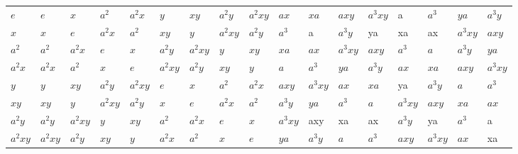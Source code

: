 {\begin{table}[h]
\begin{minipage}{\textwidth}
\begin{tabular}{l|llllllllllllllll}
$e$        &\cellcolor{blue!25} $e$        &\cellcolor{blue!25} $x$ &\cellcolor{blue!25} $a^{2}$ &\cellcolor{blue!25} $a^{2}x$ &\cellcolor{blue!25} $y$ &\cellcolor{blue!25} $xy$ &\cellcolor{blue!25} $a^{2}y$ &\cellcolor{blue!25} $a^{2}xy$ & $ax$ & $xa$ & $axy$ & $a^{3}xy$ & a & $a^{3}$ & $ya$ & $a^{3}y$ \\
$x$        &\cellcolor{blue!25} $x$        &\cellcolor{blue!25} $e$        &\cellcolor{blue!25} $a^{2}x$ &\cellcolor{blue!25} $a^{2}$ & \cellcolor{blue!25}$xy$ &\cellcolor{blue!25} $y$ &\cellcolor{blue!25} $a^{2}xy$ &\cellcolor{blue!25} $a^{2}y$ & $a^{3}$ & a & $a^{3}y$ & ya & xa & ax & $a^{3}xy$ & $axy$ \\
$a^{2}$  &\cellcolor{blue!25} $a^{2}$  &\cellcolor{blue!25} $a^{2}x$ &\cellcolor{blue!25} $e$ &\cellcolor{blue!25} $x$ &\cellcolor{blue!25} $a^{2}y$ &\cellcolor{blue!25} $a^{2}xy$ &\cellcolor{blue!25} $y$ &\cellcolor{blue!25} $xy$ & $xa$ & $ax$ & $a^{3}xy$ & $axy$ & $a^{3}$ & $a$ & $a^{3}y$ & $ya$ \\
$a^{2}x$ &\cellcolor{blue!25} $a^{2}x$ &\cellcolor{blue!25} $a^{2}$  &\cellcolor{blue!25} $x$ &\cellcolor{blue!25} $e$ &\cellcolor{blue!25} $a^{2}xy$ &\cellcolor{blue!25} $a^{2}y$ &\cellcolor{blue!25} $xy$ &\cellcolor{blue!25} $y$ & $a$ & $a^{3}$ & $ya$ & $a^{3}y$ & $ax$ & $xa$ & $axy$ & $a^{3}xy$ \\
$y$        &\cellcolor{blue!25} $y$        &\cellcolor{blue!25} $xy$        &\cellcolor{blue!25} $a^{2}y$ &\cellcolor{blue!25} $a^{2}xy$ & \cellcolor{blue!25}$e$ &\cellcolor{blue!25} $x$ &\cellcolor{blue!25} $a^{2}$ &\cellcolor{blue!25} $a^{2}x$ & $axy$ & $a^{3}xy$ & $ax$ & $xa$ & ya & $a^{3}y$ & $a$ & $a^{3}$ \\
$xy$       &\cellcolor{blue!25} $xy$       &\cellcolor{blue!25} $y$        &\cellcolor{blue!25} $a^{2}xy$ &\cellcolor{blue!25} $a^{2}y$ & \cellcolor{blue!25}$x$ &\cellcolor{blue!25} $e$ &\cellcolor{blue!25} $a^{2}x$ &\cellcolor{blue!25} $a^{2}$ & $a^{3}y$ & $ya$ & $a^{3}$ & $a$ & $a^{3}xy$ & $axy$ & $xa$ & $ax$ \\
$a^{2}y$ &\cellcolor{blue!25} $a^{2}y$ &\cellcolor{blue!25} $a^{2}xy$        &\cellcolor{blue!25} $y$ &\cellcolor{blue!25} $xy$ & \cellcolor{blue!25}$a^{2}$ &\cellcolor{blue!25} $a^{2}x$ &\cellcolor{blue!25} $e$ &\cellcolor{blue!25} $x$ & $a^{3}xy$ & axy & xa & ax & $a^{3}y$ & ya & $a^{3}$ & a \\
$a^{2}xy$&\cellcolor{blue!25} $a^{2}xy$&\cellcolor{blue!25} $a^{2}y$       &\cellcolor{blue!25} $xy$ &\cellcolor{blue!25} $y$ &\cellcolor{blue!25} $a^{2}x$ &\cellcolor{blue!25} $a^{2}$ &\cellcolor{blue!25} $x$ &\cellcolor{blue!25} $e$ & $ya$ & $a^{3}y$ & $a$ & $a^{3}$ & $axy$ & $a^{3}xy$ & $ax$ & xa \\

\end{tabular}
\end{minipage}
\end{table}}
